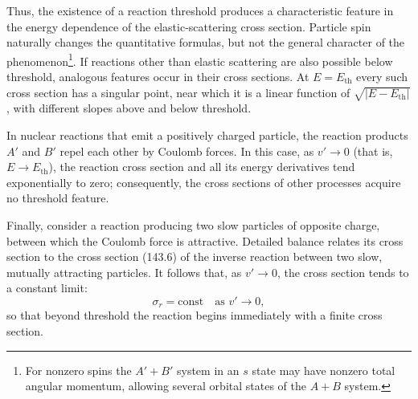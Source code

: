 Thus, the existence of a reaction threshold produces a characteristic feature in the energy dependence of the elastic-scattering cross section. Particle spin naturally changes the quantitative formulas, but not the general character of the phenomenon\footnote{For nonzero spins the $A'+B'$ system in an $s$ state may have nonzero total angular momentum, allowing several orbital states of the $A+B$ system.}. If reactions other than elastic scattering are also possible below threshold, analogous features occur in their cross sections. At $E=E_{\mathrm{th}}$ every such cross section has a singular point, near which it is a linear function of $\sqrt{|E-E_{\mathrm{th}}|}$, with different slopes above and below threshold.

\begin{figure}[tbp]
\centering
{}
\caption{}
\end{figure}

In nuclear reactions that emit a positively charged particle, the reaction products $A'$ and $B'$ repel each other by Coulomb forces. In this case, as $v'\to0$ (that is, $E\to E_{\mathrm{th}}$), the reaction cross section and all its energy derivatives tend exponentially to zero; consequently, the cross sections of other processes acquire no threshold feature.

Finally, consider a reaction producing two slow particles of opposite charge, between which the Coulomb force is attractive. Detailed balance relates its cross section to the cross section (143.6) of the inverse reaction between two slow, mutually attracting particles. It follows that, as $v'\to0$, the cross section tends to a constant limit:
\begin{equation}
 \sigma_r=\mathrm{const}\quad\text{as }v'\to0,
 \tag{147.11}
\end{equation}
so that beyond threshold the reaction begins immediately with a finite cross section.

